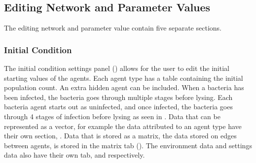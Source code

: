 \subsection{Editing Network and Parameter Values}
\label{sec:editing_network_and_parameter_values}
The editing network and parameter value contain five separate sections.
\subsubsection{Initial Condition}
The initial condition settings panel () allows for the user to edit the initial starting values of the agents. 
Each agent type has a table containing the initial population count. 
An extra hidden agent can be included. 
When a bacteria has been infected, the bacteria goes through multiple stages before lysing. Each bacteria agent starts out as uninfected, and once infected, the bacteria goes through 4 stages of infection before lysing as seen in . \newline 
Data that can be represented as a vector, for example the data attributed to an agent type have their own section, .
Data that is stored as a matrix, the data stored on edges between agents, is stored in the matrix tab ().
The environment data and settings data also have their own tab,  and  respectively.

